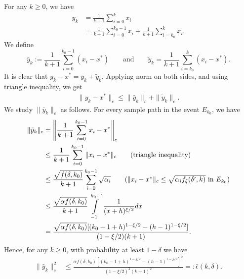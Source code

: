 \documentclass[letterpaper, 10 pt]{article}
\begin{document}
\smallskip

For any $k\geq 0$, we have
\begin{align*}
     y_k &=\frac{1}{k+1} \sum\limits_{i=0}^{k} x_i \\
     &= \frac{1}{k + 1} \sum\limits_{i=0}^{k_0-1} x_i + \frac{1}{k+1} \sum\limits_{i=k_0}^{k} x_i.
\end{align*}
We define
\[ \bar{y}_k := \frac{1}{k+1}\sum_{i=0}^{k_0-1}(x_i-x^*) \qquad \text{and} \qquad \tilde{y}_k= \frac{1}{k+1}\sum_{i=k_0}^{k}(x_i-x^*). \]
It is clear that $y_k-x^*=\bar{y}_k+\tilde{y}_k$. Applying norm on both sides, and using triangle inequality, we get
\begin{align}\label{eq:y_k_two_term}
    \|y_k-x^*\|_c\leq \|\bar{y}_k\|_c +  \|\tilde{y}_k\|_c.
\end{align}
We study $\|\bar{y}_k\|_c$ as follows. For every sample path in the event $E_{k_0}$, we have
\begin{align*}
    \|\bar{y}_k\|_c &=\left\|\frac{1}{k+1} \sum\limits_{i=0}^{k_0-1} x_i-x^*\right\|_c \\
    & \leq \frac{1}{k+1}\sum_{i=0}^{k_0-1} \|x_i-x^*\|_c  \tag{triangle inequality}\\
    &\leq \frac{\sqrt{f(\delta,k_0)}}{k+1}\sum_{i=0}^{k_0-1}\sqrt{\alpha_i}\tag{$\|x_i-x^*\|_c \leq \sqrt{\alpha_i f_\xi(\delta',k)}$ in $E_{k_0}$}\\
    &\leq \frac{\sqrt{\alpha f(\delta,k_0)}}{k+1}\int\limits_{-1}^{k_0-1}\frac{1}{(x+h)^{\xi/2}}dx\\
    &= \frac{\sqrt{\alpha f(\delta,k_0)}[(k_0-1+h)^{1-\xi/2}-(h-1)^{1-\xi/2}]}{(1-\xi/2)(k+1)}.
\end{align*}
Hence, for any $k\geq0$, with probability at least $1-\delta$ we have
\begin{align}\label{eq:loose_bound}
    \|\bar{y}_k\|_c^2&\leq \frac{\alpha f(\delta,k_0)\left[(k_0-1+h)^{1-\xi/2}-(h-1)^{1-\xi/2}\right]^2}{(1-\xi/2)^2(k+1)^{2}} =:\bar{\epsilon}(k,\delta).
\end{align}
\end{document}
